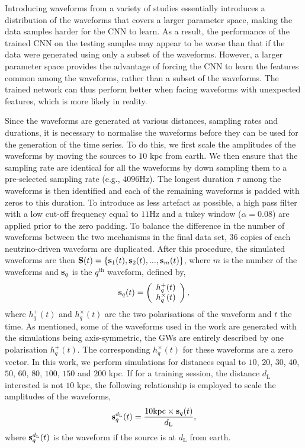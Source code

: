 \documentclass[aps,twocolumn,showpacs,groupedaddress, nofootinbib]{revtex4}  %
\begin{document}
Introducing waveforms from a variety of studies essentially introduces a distribution of the waveforms that covers a larger parameter space, 
making the data samples harder for the \ac{CNN} to learn.
As a result, the performance of the trained \ac{CNN} on the testing samples 
may appear to be worse than that if the data were generated using only a subset of the waveforms.
However, a larger parameter space provides the advantage of forcing the \ac{CNN} to 
learn the features common among the waveforms, rather than a subset of the waveforms.
The trained network can thus perform better when facing waveforms with unexpected features, which is more likely in reality.

Since the waveforms are generated at various distances, sampling rates and durations, 
it is necessary to normalise the waveforms before they can be used for the generation of the time series.
To do this, we first scale the amplitudes of the waveforms by moving the sources to $10$ kpc from earth.
We then ensure that the sampling rate are identical for all the waveforms by down sampling 
them to a pre-selected sampling rate (e.g., $4096$Hz).
The longest duration $\tau$ among the waveforms is then identified and each of the remaining waveforms is padded with zeros
to this duration.
To introduce as less artefact as possible, a high pass filter with a low cut-off frequency equal to $11$Hz 
and a tukey window ($\alpha = 0.08$) are applied prior to the zero padding. 
To balance the difference in the number of waveforms 
between the two mechanisms in the final data set, $36$ copies of each neutrino-driven waveform are duplicated.
After this procedure, the simulated 
waveforms are then $\bold{S}(t) = \{\bold{s}_{1}(t), \bold{s}_{2}(t), ..., \bold{s}_{m}(t)\}$, where $m$ is the number of the waveforms and 
$\bold{s}_{q}$ is the $q^{\text{th}}$ waveform, defined by,
\begin{equation}\label{eq:ht}
 \bold{s}_q(t) = \left(\begin{array}{c}
                        h_q^+(t) \\
                        h_q^\times(t)
                       \end{array}\right),
\end{equation}
where $h_q^+(t)$ and $h_q^\times(t)$ are the two polarisations of the waveform and $t$ the time. 
As mentioned, some of the waveforms used in the work are generated with the simulations being axis-symmetric, the \acp{GW} are entirely described by one polarisation $h_q^+(t)$. 
The corresponding $h_q^\times(t)$ for these waveforms are a zero vector. 
In this work, we perform simulations for distances equal to $10$, $20$, $30$, $40$, $50$, $60$, $80$, $100$, $150$ and $200$ kpc.
If for a training session, the distance $d_\text{L}$ interested is not $10$ kpc, the following relationship is employed to scale the amplitudes of the waveforms,
\begin{equation}\label{eq:sap}
 \bold{s}^{d_\text{L}}_q(t) =  \frac{10\text{kpc}\times\bold{s}_q(t)}{d_\text{L}},
\end{equation}
where $\bold{s}^{d_\text{L}}_q(t)$ is the waveform if the source is at $d_\text{L}$ from earth.
\end{document}
